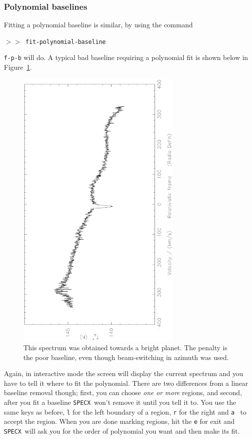 \documentclass[11pt,twoside]{article}
\newcommand{\SPECX}{{\tt SPECX}}
\newcommand{\SP}{{$>\!>$}}
\begin{document}
\subsubsection{Polynomial baselines}
\label{sec:poly-baselines}
Fitting a polynomial baseline is similar, by using the command

\SP\ \verb|fit-polynomial-baseline|

{\tt f-p-b} will do. A typical bad baseline requiring a polynomial fit
is shown below in Figure~\ref{fig:specx_badbaseline}.

\begin{figure}[htb]
\centering
\includegraphics[angle=-90,width=3.2in]{sc8_badbaseline.ps}
\vspace*{-0.5cm}
\begin{center}
\begin{minipage}[t]{5in}
\caption[Typical bad baseline]
{\small{This spectrum was obtained towards a bright planet. The
penalty is the poor baseline, even though beam-switching in azimuth
was used.  }}
\label{fig:specx_badbaseline}
\end{minipage}
\end{center}
\end{figure}

Again, in interactive mode the screen will display the current
spectrum and you have to tell it where to fit the polynomial.  There
are two differences from a linear baseline removal though; first, you
can choose {\it one or more} regions, and second, after you fit a 
baseline \SPECX\
won't remove it until you tell it to.  You use the same keys as
before, {\tt l} for the left boundary of a region, {\tt r} for the
right and {\tt a } to accept the region. When you are done marking
regions, hit the {\tt e} for exit and \SPECX\ will ask you for the
order of polynomial you want and then make its fit. 
\end{document}
